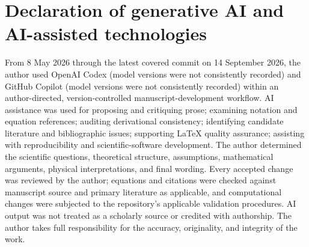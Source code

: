 \section*{Declaration of generative AI and AI-assisted technologies}

From 8 May 2026 through the latest covered commit on 14 September 2026, the author used OpenAI Codex (model versions were not consistently recorded) and GitHub Copilot (model versions were not consistently recorded) within an author-directed, version-controlled manuscript-development workflow. AI assistance was used for proposing and critiquing prose; examining notation and equation references; auditing derivational consistency; identifying candidate literature and bibliographic issues; supporting LaTeX quality assurance; assisting with reproducibility and scientific-software development. The author determined the scientific questions, theoretical structure, assumptions, mathematical arguments, physical interpretations, and final wording. Every accepted change was reviewed by the author; equations and citations were checked against manuscript source and primary literature as applicable, and computational changes were subjected to the repository's applicable validation procedures. AI output was not treated as a scholarly source or credited with authorship. The author takes full responsibility for the accuracy, originality, and integrity of the work.
